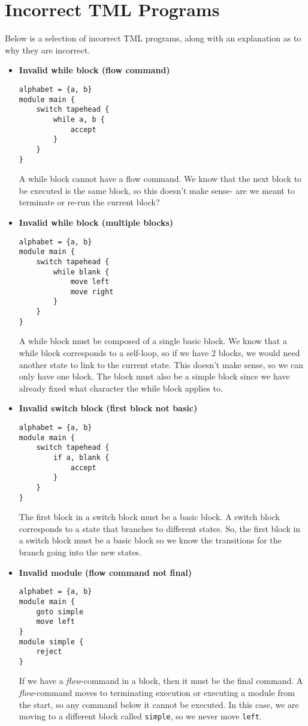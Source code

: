 \chapter{Incorrect TML Programs}

Below is a selection of incorrect TML programs, along with an explanation as to why they are incorrect.
\begin{itemize}
    \item \textbf{Invalid while block (flow command)}
\begin{lstlisting}[language=TML]
alphabet = {a, b}
module main {
    switch tapehead {
        while a, b {
            accept
        }
    }
}
\end{lstlisting}
    A while block cannot have a flow command. We know that the next block to be executed is the same block, so this doesn't make sense- are we meant to terminate or re-run the current block?

    \item \textbf{Invalid while block (multiple blocks)}
\begin{lstlisting}[language=TML]
alphabet = {a, b}
module main {
    switch tapehead {
        while blank {
            move left
            move right
        }
    }
}
\end{lstlisting}
    A while block must be composed of a single basic block. We know that a while block corresponds to a self-loop, so if we have 2 blocks, we would need another state to link to the current state. This doesn't make sense, so we can only have one block. The block must also be a simple block since we have already fixed what character the while block applies to.

    \item \textbf{Invalid switch block (first block not basic)}
\begin{lstlisting}[language=TML]
alphabet = {a, b}
module main {
    switch tapehead {
        if a, blank {
            accept
        }
    }
}
\end{lstlisting}
    The first block in a switch block must be a basic block. A switch block corresponds to a state that branches to different states. So, the first block in a switch block must be a basic block so we know the transitions for the branch going into the new states.

    \item \textbf{Invalid module (flow command not final)}
\begin{lstlisting}[language=TML]
alphabet = {a, b}
module main {
    goto simple
    move left
}
module simple {
    reject
}
\end{lstlisting}
    If we have a \emph{flow}-command in a block, then it must be the final command. A \emph{flow}-command moves to terminating execution or executing a module from the start, so any command below it cannot be executed. In this case, we are moving to a different block called \texttt{simple}, so we never move \texttt{left}.


\end{itemize}
